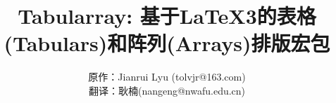 \documentclass[oneside]{book}
\begin{document}
\title{\sffamily\color{red3}Tabularray: 基于\LaTeX3的表格(Tabulars)和阵列(Arrays)排版宏包}
\author{原作：Jianrui Lyu (tolvjr@163.com)\\
        翻译：耿楠(nangeng@nwafu.edu.cn)}
\date{\mydate}
\maketitle

\tableofcontents












\end{document}

